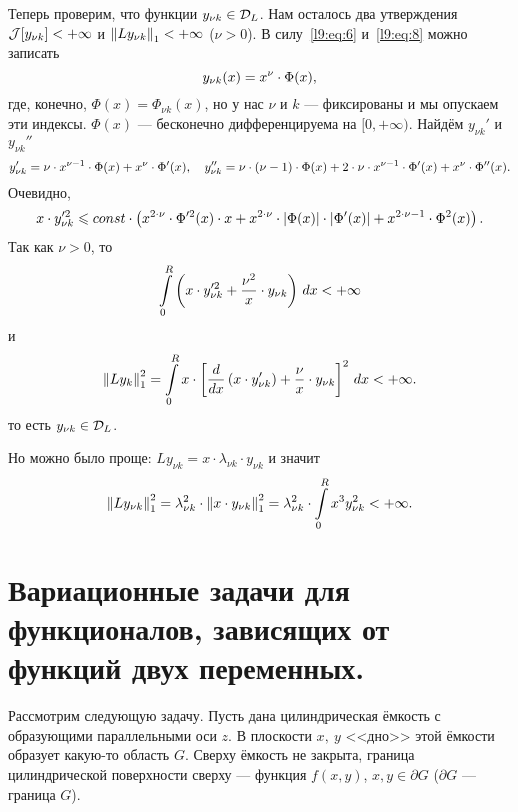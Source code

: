Теперь проверим, что функции $y_{\nu k}\in\mathcal{D}_L$. Нам осталось два утверждения $\mathcal{J}[y_{\nu k}]<+\infty$ и $\left\|Ly_{\nu k}\right\|_1<+\infty$ ($\nu>0$). В силу~\eqref{l9:eq:6} и~\eqref{l9:eq:8} можно записать
\begin{equation*}
	\hfill y_{\nu k}(x)=x^{\nu}\cdot\Phi(x),\hfill 
\end{equation*}
где, конечно, $\Phi(x)=\Phi_{\nu k}(x)$, но у нас $\nu$ и $k$ --- фиксированы и мы опускаем эти индексы. $\Phi(x)$ --- бесконечно дифференцируема на $[0,+\infty)$. Найдём $y_{\nu k}'$ и $y_{\nu k}''$
\begin{equation*}
	\hfill y_{\nu k}'=\nu\cdot x^{\nu-1}\cdot\Phi(x)+x^{\nu}\cdot\Phi'(x),\quad y_{\nu k}''=\nu\cdot(\nu-1)\cdot\Phi(x)+2\cdot\nu\cdot x^{\nu-1}\cdot\Phi'(x)+x^{\nu}\cdot\Phi''(x).\hfill
\end{equation*}
Очевидно,
\begin{equation*}
	\hfill x\cdot y_{\nu k}^{\prime2}\leqslant const\cdot\left(x^{2\cdot\nu}\cdot\Phi^{\prime2}(x)\cdot x+x^{2\cdot\nu}\cdot|\Phi(x)|\cdot|\Phi'(x)|+x^{2\cdot\nu-1}\cdot\Phi^2(x)\right).\hfill
\end{equation*}
Так как $\nu>0$, то
\begin{equation*}
	\hfill\int\limits_0^R\left(x\cdot y_{\nu k}^{\prime2}+\frac{\nu^2}{x}\cdot y_{\nu k}\right)\,dx<+\infty\hfill
\end{equation*}
и 
\begin{equation*}
	\hfill\norm{Ly_k}_1^2=\int\limits_0^R x\cdot\left[\der{}{x}\left(x\cdot y_{\nu k}'\right)+\frac{\nu}{x}\cdot y_{\nu k}\right]^2\,dx<+\infty.\hfill
\end{equation*}
то есть $y_{\nu k}\in\mathcal{D}_L$. 

Но можно было проще: $Ly_{\nu k}=x\cdot\lambda_{\nu k}\cdot y_{\nu k}$ и значит
\begin{equation*}
	\hfill\norm{Ly_{\nu k}}_1^2=\lambda_{\nu k}^2\cdot\norm{x\cdot y_{\nu k}}_1^2=\lambda_{\nu k}^2\cdot\int\limits_0^R x^3 y_{\nu k}^2<+\infty.\hfill
\end{equation*} 
\section[Функционалы, зависящие от функций двух переменных.]{Вариационные задачи для функционалов, зависящих от функций двух переменных.}
\label{lecture9section2}
Рассмотрим следующую задачу. Пусть дана цилиндрическая ёмкость с образующими параллельными оси $z$. В плоскости $x,\ y$ <<дно>> этой ёмкости образует какую-то область $G$. Сверху ёмкость не закрыта, граница цилиндрической поверхности сверху --- функция $f(x,y)$, $x,y\in\partial G$ ($\partial G$ --- граница $G$).



